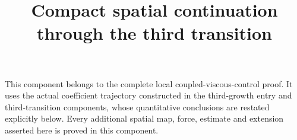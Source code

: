 \documentclass[11pt]{article}
\title{Compact spatial continuation through the third transition}
\author{}
\date{}
\begin{document}
\maketitle
\noindent This component belongs to the complete local coupled-viscous-control
proof. It uses the actual coefficient trajectory constructed in the third-growth
entry and third-transition components, whose quantitative conclusions are
restated explicitly below. Every additional spatial map, force, estimate and
extension asserted here is proved in this component.

\end{document}
